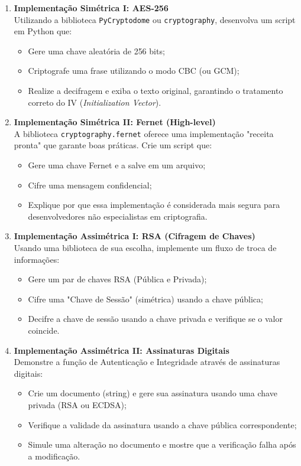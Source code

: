 \documentclass[12pt]{article}
\begin{document}
\begin{enumerate}[label=\textbf{Questão \arabic*:}, leftmargin=1.5cm, labelsep=0.5cm, resume]

    \item \textbf{Implementação Simétrica I: AES-256} \\
    Utilizando a biblioteca \texttt{PyCryptodome} ou \texttt{cryptography}, desenvolva um script em Python que:
    \begin{itemize}
        \item Gere uma chave aleatória de 256 bits;
        \item Criptografe uma frase utilizando o modo CBC (ou GCM);
        \item Realize a decifragem e exiba o texto original, garantindo o tratamento correto do IV (\textit{Initialization Vector}).
    \end{itemize}

    \item \textbf{Implementação Simétrica II: Fernet (High-level)} \\
    A biblioteca \texttt{cryptography.fernet} oferece uma implementação "receita pronta" que garante boas práticas. Crie um script que:
    \begin{itemize}
        \item Gere uma chave Fernet e a salve em um arquivo;
        \item Cifre uma mensagem confidencial;
        \item Explique por que essa implementação é considerada mais segura para desenvolvedores não especialistas em criptografia.
    \end{itemize}

    \item \textbf{Implementação Assimétrica I: RSA (Cifragem de Chaves)} \\
    Usando uma biblioteca de sua escolha, implemente um fluxo de troca de informações:
    \begin{itemize}
        \item Gere um par de chaves RSA (Pública e Privada);
        \item Cifre uma "Chave de Sessão" (simétrica) usando a chave pública;
        \item Decifre a chave de sessão usando a chave privada e verifique se o valor coincide.
    \end{itemize}

    \item \textbf{Implementação Assimétrica II: Assinaturas Digitais} \\
    Demonstre a função de Autenticação e Integridade através de assinaturas digitais:
    \begin{itemize}
        \item Crie um documento (string) e gere sua assinatura usando uma chave privada (RSA ou ECDSA);
        \item Verifique a validade da assinatura usando a chave pública correspondente;
        \item Simule uma alteração no documento e mostre que a verificação falha após a modificação.
    \end{itemize}



\end{enumerate}
\end{document}
